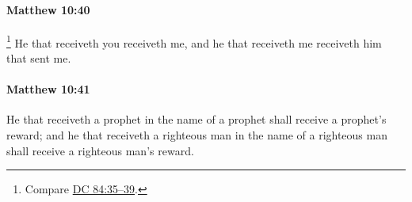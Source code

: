 		\paragraph{Matthew 10:40} %
			\label{MATTHEW-10-40}

			\footnote{%
				Compare \hyperref[DC84-35]{DC 84:35--39}.
				}%
			He that receiveth you receiveth me, and he that receiveth me receiveth him that sent me.

			\begin{framed}
			\scriptsize
				\begin{compactdesc}
					\item[SBLG] 
				\end{compactdesc}
			\end{framed}

		\paragraph{Matthew 10:41} %
			\label{MATTHEW-10-41}

			He that receiveth a prophet in the name of a prophet shall receive a prophet's reward; and he that receiveth a righteous man in the name of a righteous man shall receive a righteous man's reward.

